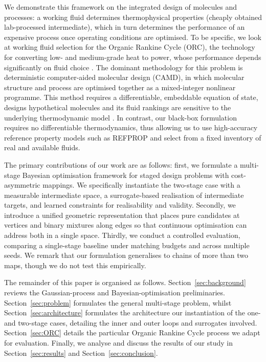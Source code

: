 \documentclass[preprint,12pt]{elsarticle}
\begin{document}
We demonstrate this framework on the integrated design of molecules and processes: a working fluid determines thermophysical properties (cheaply obtained lab-processed intermediate), which in turn determines the performance of an expensive process once operating conditions are optimised. To be specific, we look at working fluid selection for the Organic Rankine Cycle (ORC), the technology for converting low- and medium-grade heat to power, whose performance depends significantly on fluid choice \cite{camdreview2024, zeotropic2012}. The dominant methodology for this problem is deterministic computer-aided molecular design (CAMD), in which molecular structure and process are optimised together as a mixed-integer nonlinear programme. This method requires a differentiable, embeddable equation of state, designs hypothetical molecules and its fluid rankings are sensitive to the underlying thermodynamic model \cite{accuracy2025}. In contrast,  our black-box formulation requires no differentiable thermodynamics, thus allowing us to use high-accuracy reference property models such as REFPROP \cite{refprop10} and select from a fixed inventory of real and available fluids.

The primary contributions of our work are as follows: first, we formulate a multi-stage Bayesian optimisation framework for staged design problems with cost-asymmetric mappings. We specifically instantiate the two-stage case with a measurable intermediate space, a surrogate-based realisation of intermediate targets, and learned constraints for realisability and validity. Secondly, we introduce a unified geometric representation that places pure candidates at vertices and binary mixtures along edges so that continuous optimisation can address both in a single space. Thirdly, we conduct a controlled evaluation, comparing a single-stage baseline under matching budgets and across multiple seeds. We remark that our formulation generalises to chains of more than two maps, though we do not test this empirically.

The remainder of this paper is organised as follows. Section~\ref{sec:background} reviews the Gaussian-process and Bayesian-optimisation preliminaries. Section~\ref{sec:problem} formulates the general multi-stage problem, whilst Section~\ref{sec:architecture} formulates the architecture our instantiation of the one- and two-stage cases, detailing the inner and outer loops and surrogates involved. Section~\ref{sec:ORC} details the particular Organic Rankine Cycle process we adapt for evaluation. Finally, we analyse and discuss the results of our study in Section~\ref{sec:results} and Section~\ref{sec:conclusion}.
\end{document}

